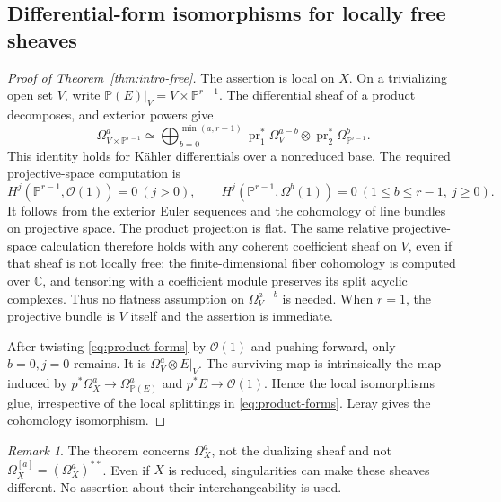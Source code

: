 \documentclass[11pt,reqno]{amsart}
\numberwithin{equation}{section}
\theoremstyle{definition}
\theoremstyle{remark}
\newtheorem{remark}[theorem]{Remark}
\newcommand{\OO}{\mathcal O}
\newcommand{\PP}{\mathbb P}
\newcommand{\CC}{\mathbb C}
\begin{document}
\subsection{Differential-form isomorphisms for locally free sheaves}
\begin{proof}[Proof of Theorem~\ref{thm:intro-free}]
The assertion is local on $X$. On a trivializing open set $V$, write $\PP(E)|_V=V\times\PP^{r-1}$. The differential sheaf of a product decomposes, and exterior powers give
\begin{equation}\label{eq:product-forms}
 \Omega_{V\times\PP^{r-1}}^a
 \simeq\bigoplus_{b=0}^{\min(a,r-1)}
 \operatorname{pr}_1^*\Omega_V^{a-b}\otimes
 \operatorname{pr}_2^*\Omega_{\PP^{r-1}}^b.
\end{equation}
This identity holds for K\"ahler differentials over a nonreduced base. The required projective-space computation is
\[
 H^j(\PP^{r-1},\OO(1))=0\ (j>0),\qquad
 H^j(\PP^{r-1},\Omega^b(1))=0\ (1\leq b\leq r-1,\ j\geq0).
\]
It follows from the exterior Euler sequences and the cohomology of line bundles on projective space. The product projection is flat. The same relative projective-space calculation therefore holds with any coherent coefficient sheaf on $V$, even if that sheaf is not locally free: the finite-dimensional fiber cohomology is computed over $\CC$, and tensoring with a coefficient module preserves its split acyclic complexes. Thus no flatness assumption on $\Omega_V^{a-b}$ is needed. When $r=1$, the projective bundle is $V$ itself and the assertion is immediate.

After twisting \eqref{eq:product-forms} by $\OO(1)$ and pushing forward, only $b=0,j=0$ remains. It is $\Omega_V^a\otimes E|_V$. The surviving map is intrinsically the map induced by $p^*\Omega_X^a\to\Omega_{\PP(E)}^a$ and $p^*E\to\OO(1)$. Hence the local isomorphisms glue, irrespective of the local splittings in \eqref{eq:product-forms}. Leray gives the cohomology isomorphism.
\end{proof}

\begin{remark}
The theorem concerns $\Omega_X^a$, not the dualizing sheaf and not $\Omega_X^{[a]}=(\Omega_X^a)^{**}$. Even if $X$ is reduced, singularities can make these sheaves different. No assertion about their interchangeability is used.
\end{remark}
\end{document}
